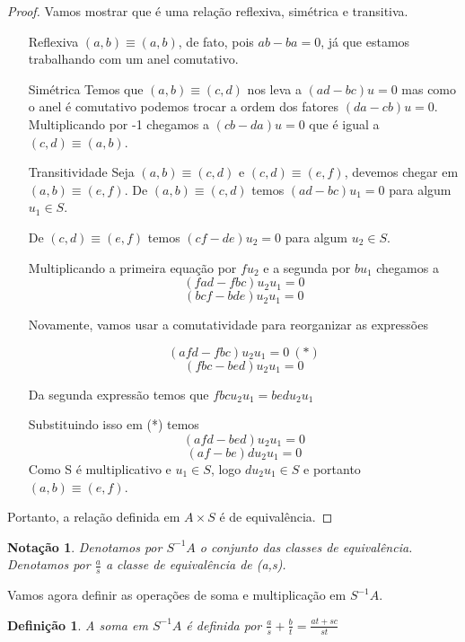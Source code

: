 \documentclass[10pt,a4paper]{article}
\newtheorem{notation}[theorem]{Notação}
\newtheorem{definition}[theorem]{Definição}
\begin{document}
\begin{proof} Vamos mostrar que é uma relação reflexiva, simétrica e transitiva.
	
	\begin{enumerate}
		\item [Reflexiva]  $(a,b) \equiv (a, b)$, de fato, pois $ab-ba = 0$, já que estamos trabalhando com um anel comutativo.
		\item [Simétrica] Temos que $(a,b) \equiv (c, d)$ nos leva a $(ad-bc)u=0$ mas como o anel é comutativo podemos trocar a ordem dos fatores $(da-cb)u=0$. Multiplicando por -1 chegamos a $(cb-da)u=0$ que é igual a $(c,d) \equiv (a, b)$.
		\item [Transitividade] Seja $(a,b) \equiv (c, d)$ e $(c,d) \equiv (e, f)$, devemos chegar em $(a,b) \equiv (e, f)$.
		De $(a,b) \equiv (c, d)$ temos $(ad-bc)u_1=0$ para algum $u_1 \in S$.
		
		De $(c,d) \equiv (e, f)$ temos $(cf-de)u_2=0$ para algum $u_2 \in S$.
		
		Multiplicando a primeira equação por $fu_2$ e a segunda por $bu_1$ chegamos a 
		$$(fad-fbc)u_2u_1=0$$
		$$(bcf-bde)u_2u_1=0$$
		
		Novamente, vamos usar a comutatividade para reorganizar as expressões
		
		$$(afd-fbc)u_2u_1=0 \ (*)$$
		$$(fbc-bed)u_2u_1=0$$
		
		Da segunda expressão temos que $fbcu_2u_1 = bedu_2u_1$
		
		Substituindo isso em (*) temos 
		$$(afd-bed)u_2u_1=0$$
		$$(af-be)du_2u_1=0$$
		Como S é multiplicativo e $u_1 \in S$, logo $du_2u_1 \in S$ e portanto $(a,b) \equiv (e, f)$.
	\end{enumerate}
	
	Portanto, a relação definida em $A \times S$ é de equivalência.
	
\end{proof}

\begin{notation}
	Denotamos por $S^{-1}A$ o conjunto das classes de equivalência. Denotamos por $\frac{a}{s}$ a classe de equivalência de (a,s).
\end{notation}

Vamos agora definir as operações de soma e multiplicação em $S^{-1}A$.

\begin{definition}
	A soma em $S^{-1}A$ é definida por $\frac{a}{s} + \frac{b}{t}=\frac{at+sc}{st}$
\end{definition}
\end{document}
